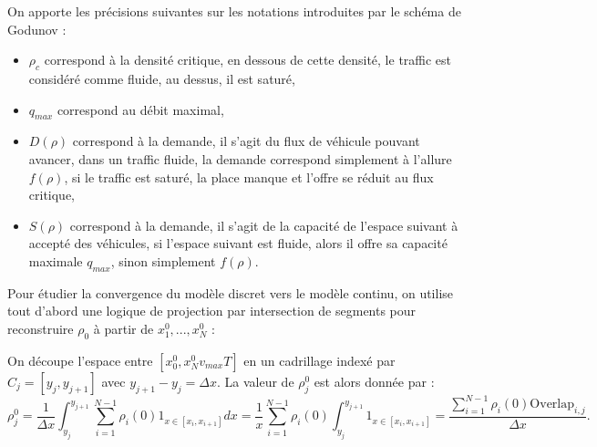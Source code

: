 \documentclass{article}
\begin{document}
On apporte les précisions suivantes sur les notations introduites par le schéma de Godunov : 
\begin{itemize}
\item $\rho_c$ correspond à la densité critique, en dessous de cette densité, le traffic est considéré comme fluide, au dessus, il est saturé,
\item $q_{max}$ correspond au débit maximal,
\item $D(\rho)$ correspond à la demande, il s'agit du flux de véhicule pouvant avancer, dans un traffic fluide, la demande correspond simplement à l'allure $f(\rho)$, si le traffic est saturé, la place manque et l'offre se réduit au flux critique,
\item $S(\rho)$ correspond à la demande, il s'agit de la capacité de l'espace suivant à accepté des véhicules, si l'espace suivant est fluide, alors il offre sa capacité maximale $q_{max}$, sinon simplement $f(\rho)$.
\end{itemize}
\bigskip
Pour étudier la convergence du modèle discret vers le modèle continu, on utilise tout d'abord une logique de projection par intersection de segments pour reconstruire $\rho_0$ à partir de $x_1^0,..., x_N^0$ :

On découpe l'espace entre $[x_0^0, x_N^0 v_{max}  T]$ en un cadrillage indexé par $C_j = [y_j, y_{j+1}]$ avec $y_{j+1} - y_j = \Delta x$. La valeur de $\rho^0_j$ est alors donnée par : 
$$\rho^0_j = \frac{1}{\Delta x}\int_{y_j}^{y_{j+1}}\sum_{i=1}^{N-1}\rho_i(0)1_{x\in [x_i,x_{i+1}]}dx = \frac{1}{x}\sum_{i=1}^{N-1}\rho_i(0)\int_{y_j}^{y_{j+1}}1_{x\in[x_i,x_{i+1}]} = \frac{\sum_{i=1}^{N-1}\rho_i(0) \text{Overlap}_{i,j}}{\Delta x}.$$
\end{document}
